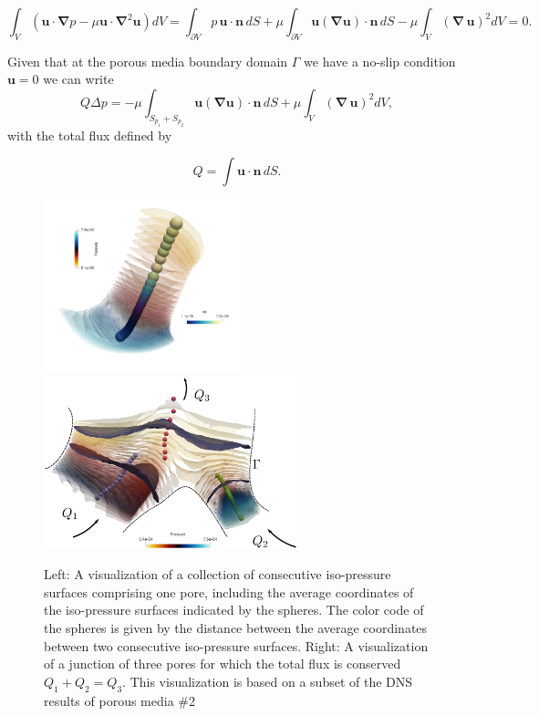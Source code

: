 \documentclass[draft]{agujournal2019}
\begin{document}
\begin{equation}
\int_V \left(\mathbf{u}\cdot\mathbf{\nabla} p-\mu \mathbf{u}\cdot\mathbf{\nabla}^2 \mathbf{u}\right) dV 
= \int_{\partial V}  p\,\mathbf{u}\cdot\mathbf{n}\,dS+\mu \int_{\partial V} \mathbf{u} (\mathbf{\nabla} \mathbf{u})\cdot\mathbf{n}\,dS-\mu \int_{V} (\mathbf{\nabla}\, \mathbf{u})^2 dV=0. \label{eq:stokes_dissipation}
\end{equation}

Given that at the porous media boundary domain $\Gamma$ we have a no-slip condition $\mathbf{u}=0$ we can write 
\begin{equation}
	Q \Delta p = -\mu\int_{S_{p_1}+S_{p_2}} \mathbf{u} (\mathbf{\nabla} \mathbf{u})\cdot\mathbf{n}\,dS +\mu \int_V (\mathbf{\nabla}\, \mathbf{u})^2 dV, \label{eq:pressuredrop}
\end{equation}
with the total flux defined by 

\begin{equation}
	Q=\int \mathbf{u}\cdot\mathbf{n}\, dS.
\end{equation}


\begin{figure}[t!]
\includegraphics[height=5cm]{figures/example_pore.png}~~~~
\includegraphics[height=5cm]{figures/merging_pores.eps}
\caption{Left: A visualization of a collection of consecutive iso-pressure surfaces comprising one pore, including the average coordinates of the iso-pressure surfaces indicated by the spheres. The color code of the spheres is given by the distance between the average coordinates between two consecutive iso-pressure surfaces. Right: A visualization of a junction of three pores for which the total flux is conserved $Q_1+Q_2 = Q_3$. This visualization is based on a subset of the DNS results of porous media \#2}
\label{fig:isop_surfaces}
\end{figure}
\end{document}
